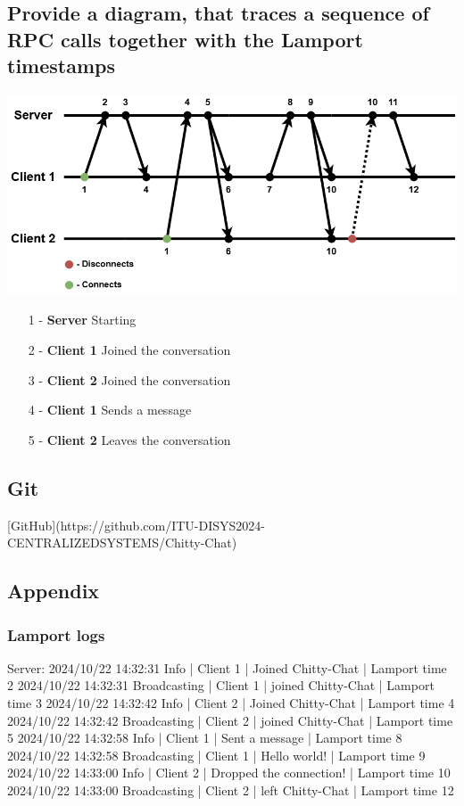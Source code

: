 \documentclass[a4paper,11pt]{article}
\begin{document}
\subsection*{Provide a diagram, that traces a sequence of RPC calls together with the Lamport timestamps}
\includegraphics[width=\textwidth]{chat.png}
\begin{enumerate}
        \setlength{\itemsep}{1pt}
        \setlength{\parskip}{0pt}
        \item[1 - \textbf{Server \;}]Starting
        \item[2 - \textbf{Client 1}] Joined the conversation
        \item[3 - \textbf{Client 2}] Joined the conversation
        \item[4 - \textbf{Client 1}] Sends a message
        \item[5 - \textbf{Client 2}] Leaves the conversation
    \end{enumerate}

\subsection*{Git}
[GitHub](https://github.com/ITU-DISYS2024-CENTRALIZEDSYSTEMS/Chitty-Chat)

\subsection*{Appendix}

\subsubsection*{Lamport logs}
Server:
2024/10/22 14:32:31 Info | Client 1 | Joined Chitty-Chat | Lamport time 2
2024/10/22 14:32:31 Broadcasting | Client 1 | joined Chitty-Chat | Lamport time 3
2024/10/22 14:32:42 Info | Client 2 | Joined Chitty-Chat | Lamport time 4
2024/10/22 14:32:42 Broadcasting | Client 2 | joined Chitty-Chat | Lamport time 5
2024/10/22 14:32:58 Info | Client 1 | Sent a message | Lamport time 8
2024/10/22 14:32:58 Broadcasting | Client 1 | Hello world! | Lamport time 9
2024/10/22 14:33:00 Info | Client 2 | Dropped the connection! | Lamport time 10
2024/10/22 14:33:00 Broadcasting | Client 2 | left Chitty-Chat | Lamport time 12
\end{document}
